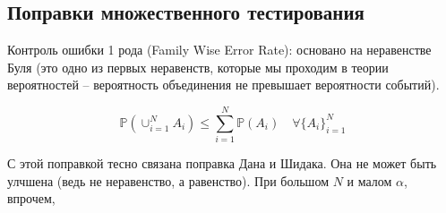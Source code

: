 \documentclass[main.tex]{subfiles}
\begin{document}
\subsection{Поправки множественного тестирования}

Контроль ошибки 1 рода (Family Wise Error Rate): основано на неравенстве Буля (это одно из первых неравенств, которые мы проходим в теории вероятностей -- вероятность объединения не превышает вероятности событий).

\[ \mathds P \left( \cup_{i=1}^N A_i \right) \le \sum_{i=1}^N \mathds P (A_i) \quad \forall \{ A_i \}_{i=1}^N \]

С этой поправкой тесно связана поправка Дана и Шидака.
Она не может быть улчшена (ведь не неравенство, а равенство).
При большом $ N $ и малом $ \alpha $, впрочем, 
\end{document}
